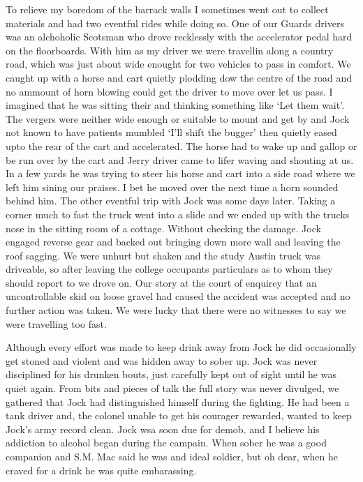 To relieve my boredom of the barrack walls I sometimes went out to
collect materials and had two eventful rides while doing so. One of
our Guards drivers was an alchoholic Scotsman who drove recklessly
with the accelerator pedal hard on the floorboards. With him as my
driver we were travellin along a country road, which was just about
wide enought for two vehicles to pass in comfort. We caught up with a
horse and cart quietly plodding dow the centre of the road and no
ammount of horn blowing could get the driver to move over let us
pass. I imagined that he was sitting their and thinking something like
`Let them wait'. The vergers were neither wide enough or suitable to
mount and get by and Jock not known to have patients mumbled `I'll
shift the bugger' then quietly eased upto the rear of the cart and
accelerated. The horse had to wake up and gallop or be run over by the
cart and Jerry driver came to lifer waving and shouting at us. In a
few yards he was trying to steer his horse and cart into a side road
where we left him sining our praises. I bet he moved over the next
time a horn sounded behind him. The other eventful trip with Jock was
some days later. Taking a corner much to fast the truck went into a
slide and we ended up with the trucks nose in the sitting room of a
cottage. Without checking the damage. Jock engaged reverse gear and
backed out bringing down more wall and leaving the roof sagging. We
were unhurt but shaken and the study Austin truck was driveable, so
after leaving the college occupants particulars as to whom they should
report to we drove on. Our story at the court of enquirey that an
uncontrollable skid on loose gravel had caused the accident was
accepted and no further action was taken. We were lucky that there
were no witnesses to say we were travelling too fast.

Although every effort was made to keep drink away from Jock he did
occasionally get stoned and violent and was hidden away to sober
up. Jock was never disciplined for his drunken bouts, just carefully
kept out of sight until he was quiet again. From bits and pieces of
talk the full story was never divulged, we gathered that Jock had
distinguished himself during the fighting. He had been a tank driver
and, the colonel unable to get his courager rewarded, wanted to keep
Jock's army record clean. Jock wsa soon due for demob. and I believe
his addiction to alcohol began during the campain. When sober he was a
good companion and S.M. Mac said he was and ideal soldier, but oh
dear, when he craved for a drink he was quite embarassing.

